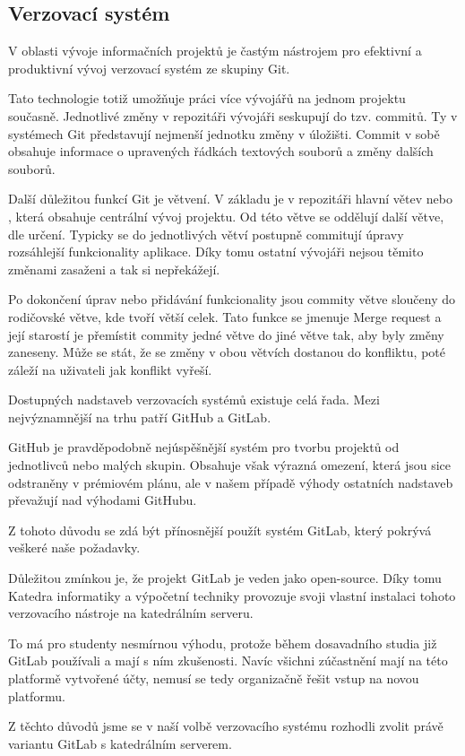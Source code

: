 \documentclass[czech,BP]{thesiskiv}
\begin{document}
\subsection{Verzovací systém}
	\par V oblasti vývoje informačních projektů je častým nástrojem pro efektivní a produktivní vývoj verzovací systém ze skupiny Git.
	\par Tato technologie totiž umožňuje práci více vývojářů na jednom projektu současně. Jednotlivé změny v repozitáři vývojáři seskupují do tzv. commitů. Ty v systémech Git představují nejmenší jednotku změny v úložišti. Commit v sobě obsahuje informace o upravených řádkách textových souborů a změny dalších souborů.
	\par Další důležitou funkcí Git je větvení. V základu je v repozitáři hlavní větev  nebo , která obsahuje centrální vývoj projektu. Od této větve se oddělují další větve, dle určení. Typicky se do jednotlivých větví postupně commitují úpravy rozsáhlejší funkcionality aplikace. Díky tomu ostatní vývojáři nejsou těmito změnami zasaženi a tak si nepřekážejí.
	\par Po dokončení úprav nebo přidávání funkcionality jsou commity větve sloučeny do rodičovské větve, kde tvoří větší celek. Tato funkce se jmenuje Merge request a její starostí je přemístit commity jedné větve do jiné větve tak, aby byly změny zaneseny. Může se stát, že se změny v obou větvích dostanou do konfliktu, poté záleží na uživateli jak konflikt vyřeší.
	\par Dostupných nadstaveb verzovacích systémů existuje celá řada. Mezi nejvýznamnější na trhu patří GitHub a GitLab.
	\par GitHub je pravděpodobně nejúspěšnější systém pro tvorbu projektů od jednotlivců nebo malých skupin. Obsahuje však výrazná omezení, která jsou sice odstraněny v prémiovém plánu, ale v našem případě výhody ostatních nadstaveb převažují nad výhodami GitHubu.
	\par Z tohoto důvodu se zdá být přínosnější použít systém GitLab, který pokrývá veškeré naše požadavky. 
	\par Důležitou zmínkou je, že projekt GitLab je veden jako open-source. Díky tomu Katedra informatiky a výpočetní techniky provozuje svoji vlastní instalaci tohoto verzovacího nástroje na katedrálním serveru.
	\par To má pro studenty nesmírnou výhodu, protože během dosavadního studia již GitLab používali a mají s ním zkušenosti. Navíc všichni zúčastnění mají na této platformě vytvořené účty, nemusí se tedy organizačně řešit vstup na novou platformu.
	\par Z těchto důvodů jsme se v naší volbě verzovacího systému rozhodli zvolit právě variantu GitLab s katedrálním serverem.
\end{document}

